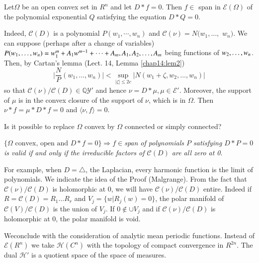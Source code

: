 \begin{theorem*}%
 Let\pageoriginale $\Omega$ be an open convex set in $R^n$ and let $D * f =
 0$. Then $f \in $ span in $\mathscr{E}(\Omega)$ of the polynomial
 exponential $Q$ satisfying the equation $D * Q = 0$. 
\end{theorem*}

Indeed, $\mathscr{C}(D)$ is a polynomial $P(w_1,\cdots, w_n)$ and
$\mathscr{C} (\nu) = N (w_1, \ldots,$ $w_n)$. We can suppose (perhaps
after a change of variables) $P(w_1, \ldots,\break w_n) = w_1^{m} + A_1
w^{m-1} + \cdots + A_m, A_1, A_2, \ldots, A_m$ being functions of
$w_2, \ldots,\break w_n$. Then, by Cartan's lemma (Lect. 14, Lemma
\ref{chap14:lem2})  
$$
\Big|\frac{N}{P}(w_1,\ldots, w_n) \Big| < \sup_{|\zeta|\le 2c} \Big|
N(w_1 + \zeta, w_2, \ldots, w_n)\Big| 
$$
so that $\mathscr{C}(\nu)\Big/ \mathscr{C}(D) \in
\mathbb{Q}\mathscr{Y}'$ and hence $\nu = D * \mu, \mu \in
\mathscr{E}'$. Moreover, the support of $\mu$ is in the convex closure
of the support of $\nu$, which is in $\Omega$. Then $\nu * f = \mu * D
* f = 0$ and $\langle \nu, f \rangle = 0$. 

\setcounter{prob}{0}
\begin{prob}\label{chap24:prob1}%
 Is it possible to replace $\Omega$ convex by $\Omega$ connected or
 simply connected? 
\end{prob}

\begin{theorem*}%
 $\{ \Omega \text{ convex, open and } D * f = 0\}\Rightarrow f \in
 ${\em{span of polynomials $P$ satisfying $D * P = 0$ is valid if and
  only if the irreducible factors of $\mathscr{C}(D)$ are all zero
  at 0}}. 
\end{theorem*}

For example, when $D = \triangle$, the Laplacian, every harmonic
function is the limit of polynomials. We indicate the idea of the
Proof (Malgrange). From the fact that $\mathscr{C}(\nu)\Big/
\mathscr{C}(D)$ is holomorphic at $0$, we will have
$\mathscr{C}(\nu)\Big/ \mathscr{C}(D)$ entire. Indeed if $R =
\mathscr{C}(D) = R_1 \ldots R_r$ and $V_j = \{w| R_j(w)= 0 \}$, the
polar manifold of $\mathscr{C}(V) / \mathscr{C}(D)$ is the union of
$V_j$. If $0 \notin \cup V_j$ and if $\mathscr{C}(\nu)/\mathscr{C}(D)$
is holomorphic at $0$, the polar manifold is void. 

We\pageoriginale conclude with the consideration of analytic mean periodic
functions. Instead of $\mathscr{E}(R^n)$ we take $\mathscr{H}(C^n)$
with the topology of compact convergence in $R^{2n}$. The dual
$\mathscr{H}'$ is a quotient space of the space of measures. 

